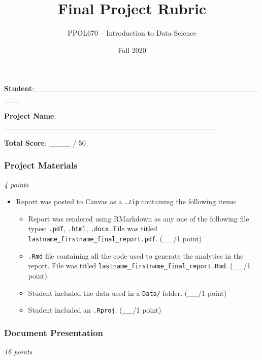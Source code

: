\documentclass[
  11pt,
]{article}
\title{\textbf{Final Project Rubric}}
\author{\Large PPOL670 -- Introduction to Data Science}
\date{Fall 2020}
\providecommand{\tightlist}{%
  \setlength{\itemsep}{0pt}\setlength{\parskip}{0pt}}
\begin{document}
\maketitle

\textbf{Student}:\_\_\_\_\_\_\_\_\_\_\_\_\_\_\_\_\_\_\_\_\_\_\_\_\_\_\_\_\_\_\_\_\_\_\_\_\_\_\_\_\_\_\_\_\_

\textbf{Project Name}:
\_\_\_\_\_\_\_\_\_\_\_\_\_\_\_\_\_\_\_\_\_\_\_\_\_\_\_\_\_\_\_\_\_\_\_\_\_\_\_\_

\textbf{Total Score}: \_\_\_\_ / 50

\hypertarget{project-materials}{%
\subsubsection{Project Materials}\label{project-materials}}

\emph{4 points}

\begin{itemize}
\tightlist
\item
  Report was posted to Canvas as a \texttt{.zip} containing the
  following items:

  \begin{itemize}
  \tightlist
  \item
    Report was rendered using RMarkdown as any one of the following file
    types: \texttt{.pdf}, \texttt{.html}, \texttt{.docx}. File was
    titled \texttt{lastname\_firstname\_final\_report.pdf}. (\_\_/1
    point)
  \item
    \texttt{.Rmd} file containing all the code used to generate the
    analytics in the report. File was titled
    \texttt{lastname\_firstname\_final\_report.Rmd}. (\_\_/1 point)
  \item
    Student included the data used in a \texttt{Data/} folder. (\_\_/1
    point)
  \item
    Student included an \texttt{.Rproj}. (\_\_/1 point)
  \end{itemize}
\end{itemize}

\hypertarget{document-presentation}{%
\subsubsection{Document Presentation}\label{document-presentation}}

\emph{16 points}
\end{document}
